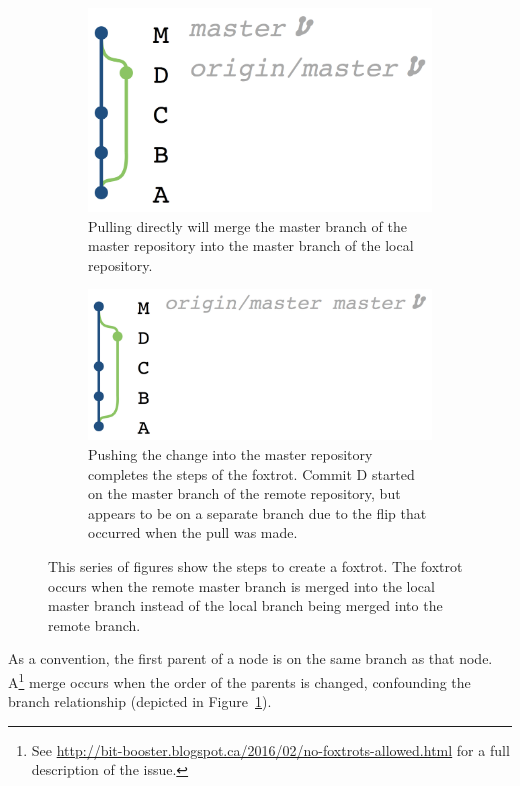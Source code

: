 \begin{figure}[htpb]
  \begin{subfigure}[b]{0.3\textwidth}
    \includegraphics[width=\textwidth]{Figures/background/foxtrot/step_6.png}
    \caption{Pulling directly will merge the master branch of the master
      repository into the master branch of the local repository.}
  \end{subfigure}
  \begin{subfigure}[b]{0.3\textwidth}
    \includegraphics[width=\textwidth]{Figures/background/foxtrot/step_7.png}
    \caption{Pushing the change into the master repository completes the
      steps of the foxtrot. Commit D started on the master branch of the
      remote repository, but appears to be on a separate branch due to
      the flip that occurred when the pull was made.}
  \end{subfigure}

  \caption{This series of figures show the steps to create a foxtrot.
    The foxtrot occurs when the remote master branch is merged into the
    local master branch instead of the local branch being merged into
    the remote branch.}
  \label{fig:foxtrot_steps}
\end{figure}

As a convention, the first parent of a node is on the same branch as
that node.
A\foxtrot\footnote{See \url{http://bit-booster.blogspot.ca/2016/02/no-foxtrots-allowed.html} for a full description of the issue.}
merge occurs when the order of the parents is changed, confounding the
branch relationship (depicted in Figure~\ref{fig:foxtrot_steps}).

